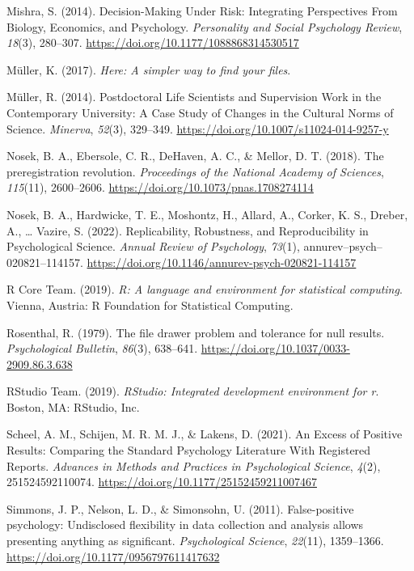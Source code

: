 \documentclass[british,,doc,mask,floatsintext]{apa6}
\begin{document}
\leavevmode\hypertarget{ref-Mishra2014}{}%
Mishra, S. (2014). Decision-Making Under Risk: Integrating Perspectives From Biology, Economics, and Psychology. \emph{Personality and Social Psychology Review}, \emph{18}(3), 280--307. \url{https://doi.org/10.1177/1088868314530517}

\leavevmode\hypertarget{ref-R-here}{}%
Müller, K. (2017). \emph{Here: A simpler way to find your files}.

\leavevmode\hypertarget{ref-Muller2014}{}%
Müller, R. (2014). Postdoctoral Life Scientists and Supervision Work in the Contemporary University: A Case Study of Changes in the Cultural Norms of Science. \emph{Minerva}, \emph{52}(3), 329--349. \url{https://doi.org/10.1007/s11024-014-9257-y}

\leavevmode\hypertarget{ref-Nosek2018}{}%
Nosek, B. A., Ebersole, C. R., DeHaven, A. C., \& Mellor, D. T. (2018). The preregistration revolution. \emph{Proceedings of the National Academy of Sciences}, \emph{115}(11), 2600--2606. \url{https://doi.org/10.1073/pnas.1708274114}

\leavevmode\hypertarget{ref-Nosek2022}{}%
Nosek, B. A., Hardwicke, T. E., Moshontz, H., Allard, A., Corker, K. S., Dreber, A., \ldots{} Vazire, S. (2022). Replicability, Robustness, and Reproducibility in Psychological Science. \emph{Annual Review of Psychology}, \emph{73}(1), annurev--psych--020821--114157. \url{https://doi.org/10.1146/annurev-psych-020821-114157}

\leavevmode\hypertarget{ref-R-base}{}%
R Core Team. (2019). \emph{R: A language and environment for statistical computing}. Vienna, Austria: R Foundation for Statistical Computing.

\leavevmode\hypertarget{ref-Rosenthal1979}{}%
Rosenthal, R. (1979). The file drawer problem and tolerance for null results. \emph{Psychological Bulletin}, \emph{86}(3), 638--641. \url{https://doi.org/10.1037/0033-2909.86.3.638}

\leavevmode\hypertarget{ref-RStudioTeam2019}{}%
RStudio Team. (2019). \emph{RStudio: Integrated development environment for r}. Boston, MA: RStudio, Inc.

\leavevmode\hypertarget{ref-Scheel2021}{}%
Scheel, A. M., Schijen, M. R. M. J., \& Lakens, D. (2021). An Excess of Positive Results: Comparing the Standard Psychology Literature With Registered Reports. \emph{Advances in Methods and Practices in Psychological Science}, \emph{4}(2), 251524592110074. \url{https://doi.org/10.1177/25152459211007467}

\leavevmode\hypertarget{ref-Simmons2011}{}%
Simmons, J. P., Nelson, L. D., \& Simonsohn, U. (2011). False-positive psychology: Undisclosed flexibility in data collection and analysis allows presenting anything as significant. \emph{Psychological Science}, \emph{22}(11), 1359--1366. \url{https://doi.org/10.1177/0956797611417632}
\end{document}
